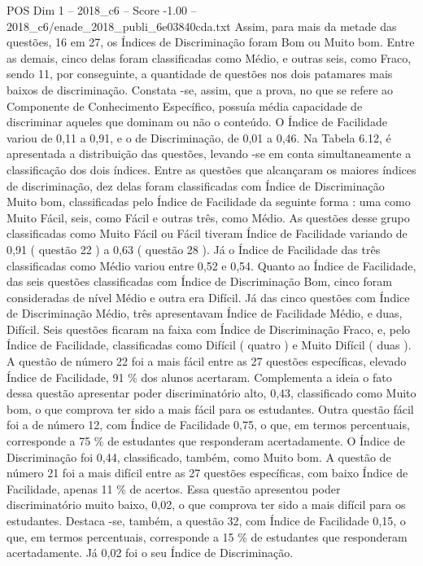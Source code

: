 \begin{textsample}{POS Dim 1 – 2018\_c6 – Score -1.00 – 2018\_c6/enade\_2018\_publi\_6e03840cda.txt}
Assim, para mais da metade das questões, 16 em 27, os Índices de Discriminação foram Bom ou Muito bom.
Entre as demais, cinco delas foram classificadas como Médio, e outras seis, como Fraco, sendo 11, por conseguinte, a quantidade de questões nos dois patamares mais baixos de discriminação.
Constata -se, assim, que a prova, no que se refere ao Componente de Conhecimento Específico, possuía média capacidade de discriminar aqueles que dominam ou não o conteúdo.
O Índice de Facilidade variou de 0,11 a 0,91, e o de Discriminação, de 0,01 a 0,46.
Na Tabela 6.12, é apresentada a distribuição das questões, levando -se em conta simultaneamente a classificação dos dois índices.
Entre as questões que alcançaram os maiores índices de discriminação, dez delas foram classificadas com Índice de Discriminação Muito bom, classificadas pelo Índice de Facilidade da seguinte forma : uma como Muito Fácil, seis, como Fácil e outras três, como Médio.
As questões desse grupo classificadas como Muito Fácil ou Fácil tiveram Índice de Facilidade variando de 0,91 ( questão 22 ) a 0,63 ( questão 28 ).
Já o Índice de Facilidade das três classificadas como Médio variou entre 0,52 e 0,54.
Quanto ao Índice de Facilidade, das seis questões classificadas com Índice de Discriminação Bom, cinco foram consideradas de nível Médio e outra era Difícil.
Já das cinco questões com Índice de Discriminação Médio, três apresentavam Índice de Facilidade Médio, e duas, Difícil.
Seis questões ficaram na faixa com Índice de Discriminação Fraco, e, pelo Índice de Facilidade, classificadas como Difícil ( quatro ) e Muito Difícil ( duas ).
A questão de número 22 foi a mais fácil entre as 27 questões específicas, elevado Índice de Facilidade, 91 \% dos alunos acertaram.
Complementa a ideia o fato dessa questão apresentar poder discriminatório alto, 0,43, classificado como Muito bom, o que comprova ter sido a mais fácil para os estudantes.
Outra questão fácil foi a de número 12, com Índice de Facilidade 0,75, o que, em termos percentuais, corresponde a 75 \% de estudantes que responderam acertadamente.
O Índice de Discriminação foi 0,44, classificado, também, como Muito bom.
A questão de número 21 foi a mais difícil entre as 27 questões específicas, com baixo Índice de Facilidade, apenas 11 \% de acertos.
Essa questão apresentou poder discriminatório muito baixo, 0,02, o que comprova ter sido a mais difícil para os estudantes.
Destaca -se, também, a questão 32, com Índice de Facilidade 0,15, o que, em termos percentuais, corresponde a 15 \% de estudantes que responderam acertadamente.
Já 0,02 foi o seu Índice de Discriminação.

\end{textsample}
